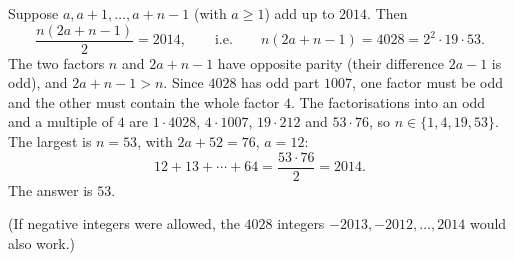 Suppose $a,a+1,\dots,a+n-1$ (with $a\ge1$) add up to $2014$. Then
\[\dfrac{n(2a+n-1)}{2}=2014,\qquad\text{i.e.}\qquad n(2a+n-1)=4028=2^2\cdot19\cdot53.\]
The two factors $n$ and $2a+n-1$ have opposite parity (their difference $2a-1$ is odd), and $2a+n-1>n$. Since $4028$ has odd part $1007$, one factor must be odd and the other must contain the whole factor $4$. The factorisations into an odd and a multiple of $4$ are $1\cdot4028$, $4\cdot1007$, $19\cdot212$ and $53\cdot76$, so $n\in\{1,4,19,53\}$. The largest is $n=53$, with $2a+52=76$, $a=12$:
\[12+13+\cdots+64=\dfrac{53\cdot76}{2}=2014.\]
The answer is $\boxed{53}$.

(If negative integers were allowed, the $4028$ integers $-2013,-2012,\dots,2014$ would also work.)
